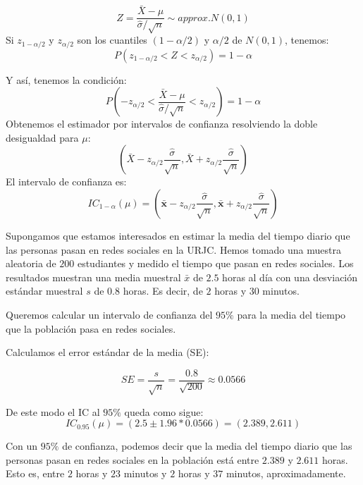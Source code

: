 \documentclass[
  letterpaper,
  DIV=11,
  numbers=noendperiod]{scrreprt}
\begin{document}
\[
Z=\frac{\bar{X}-\mu}{\hat{\sigma}/\sqrt{n}}\sim approx. N(0,1)
\] Si \(z_{1-\alpha/2}\) y \(z_{\alpha/2}\) son los cuantiles
\((1-\alpha/2)\) y \(\alpha/2\) de \(N(0,1)\), tenemos: \[
P(z_{1-\alpha/2}<Z<z_{\alpha/2})=1-\alpha
\]

Y así, tenemos la condición: \[
P\left ( -z_{\alpha/2}<\frac{\bar{X}-\mu}{\hat{\sigma}/\sqrt{n}}<z_{\alpha/2} \right )=1-\alpha
\] Obtenemos el estimador por intervalos de confianza resolviendo la
doble desigualdad para \(\mu\): \[
\left ( \bar{X}-z_{\alpha/2}\frac{\hat{\sigma}}{\sqrt{n}}, \bar{X}+z_{\alpha/2}\frac{\hat{\sigma}}{\sqrt{n}} \right )
\] El intervalo de confianza es: \[
IC_{1-\alpha}(\mu)=\left ( \bar{\mathbf{x}}-z_{\alpha/2}\frac{\hat{\sigma}}{\sqrt{n}}, \bar{\mathbf{x}}+z_{\alpha/2}\frac{\hat{\sigma}}{\sqrt{n}} \right )
\]

\begin{tcolorbox}[enhanced jigsaw, arc=.35mm, breakable, coltitle=black, left=2mm, opacityback=0, bottomtitle=1mm, colbacktitle=quarto-callout-tip-color!10!white, title=\textcolor{quarto-callout-tip-color}{\faLightbulb}\hspace{0.5em}{Ejemplo. Intervalo de confianza para media de muestras grandes}, titlerule=0mm, colback=white, colframe=quarto-callout-tip-color-frame, bottomrule=.15mm, rightrule=.15mm, opacitybacktitle=0.6, toptitle=1mm, toprule=.15mm, leftrule=.75mm]

Supongamos que estamos interesados en estimar la media del tiempo diario
que las personas pasan en redes sociales en la URJC. Hemos tomado una
muestra aleatoria de \(200\) estudiantes y medido el tiempo que pasan en
redes sociales. Los resultados muestran una media muestral \(\bar{x}\)
de \(2.5\) horas al día con una desviación estándar muestral \(s\) de
\(0.8\) horas. Es decir, de \(2\) horas y \(30\) minutos.

Queremos calcular un intervalo de confianza del \(95\%\) para la media
del tiempo que la población pasa en redes sociales.

Calculamos el error estándar de la media (SE):

\[
SE = \frac{s}{\sqrt{n}}= \frac{0.8}{\sqrt{200}} \approx 0.0566
\]

De este modo el IC al \(95\%\) queda como sigue: \[
IC_{0.95}(\mu)=\left ( 2.5\pm1.96 * 0.0566\right) =(2.389, 2.611)
\]

Con un \(95\%\) de confianza, podemos decir que la media del tiempo
diario que las personas pasan en redes sociales en la población está
entre \(2.389\) y \(2.611\) horas. Esto es, entre \(2\) horas y \(23\)
minutos y \(2\) horas y \(37\) minutos, aproximadamente.

\end{tcolorbox}
\end{document}
